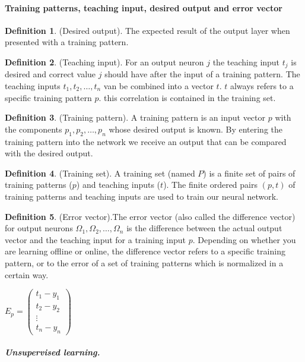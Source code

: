 \documentclass[pdftex,a4paper,12pt,twoside]{report}
\theoremstyle{plain} \newtheorem{theorem}{Theorem} \newtheorem{proposition}{Proposition} \newtheorem{lemma}{Lemma} \newtheorem*{corollary}{Corollary}
\theoremstyle{definition} \newtheorem{definition}{Definition} \newtheorem{conjecture}{Conjecture} \newtheorem*{example}{Example} \newtheorem{algorithm}{Algorithm}
\theoremstyle{remark} \newtheorem*{remark}{Remark} \newtheorem*{note}{Note} \newtheorem{case}{Case}
\begin{document}
\paragraph{Training patterns, teaching input, desired output and error vector}
\begin{definition}
(Desired output). The expected result of the output layer when presented with a training pattern.
\end{definition}
\begin{definition}
(Teaching input). For an output neuron $j$ the teaching input $t_j$ is desired and correct value $j$ should have after the input of a training pattern. The teaching inputs $t_1,t_2, \dotsc ,t_n$ van be combined into a vector $t$. $t$ always refers to a specific training pattern $p$. this correlation is contained in the training set.
\end{definition}
\begin{definition}
(Training pattern). A training pattern is an input vector $p$ with the components $p_1,p_2, \dotsc , p_n$ whose desired output is known. By entering the training pattern into the network we receive an output that can be compared with the desired output. 
\end{definition}
\begin{definition}
(Training set). A training set (named $P$) is a finite set of pairs of training patterns ($p$) and teaching inputs ($t$). The finite ordered pairs $(p,t)$ of training patterns and teaching inputs are used to train our neural network.
\end{definition}
\begin{definition}
(Error vector).The error vector (also called the difference vector) for output neurons $\Omega_1,\Omega_2, \dotsc ,\Omega_n$ is the difference between the actual output vector and the teaching input for a training input $p$. Depending on whether you are learning offline or online, the difference vector refers to a specific training pattern, or to the error of a set of training patterns which is normalized in a certain way.\begin{center}
$E_p = 	\begin{pmatrix}
			t_1-y_1\\
			t_2-y_2\\
			\vdots\\
			t_n-y_n
		\end{pmatrix}$
\end{center}
\end{definition}
\subparagraph{Unsupervised learning.}
\end{document}
